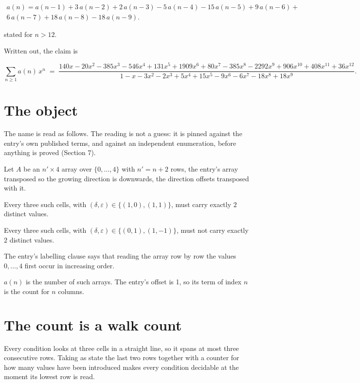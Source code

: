 \documentclass[11pt]{article}
\theoremstyle{definition}
\begin{document}
\begin{multline*} a(n) = a(n-1) + 3\,a(n-2) + 2\,a(n-3) - 5\,a(n-4) - 15\,a(n-5) + 9\,a(n-6) + \\ 6\,a(n-7) + 18\,a(n-8) - 18\,a(n-9). \end{multline*}

stated for $n > 12$.

Written out, the claim is

\[\sum_{n \ge 1} a(n)\,x^n \;=\; \frac{140x - 20x^{2} - 385x^{3} - 546x^{4} + 131x^{5} + 1909x^{6} + 80x^{7} - 385x^{8} - 2292x^{9} + 906x^{10} + 408x^{11} + 36x^{12}}{1 - x - 3x^{2} - 2x^{3} + 5x^{4} + 15x^{5} - 9x^{6} - 6x^{7} - 18x^{8} + 18x^{9}}.\]

\section{The object}

The name is read as follows. The reading is not a guess: it is pinned against the entry's own published terms, and against an independent enumeration, before anything is proved (Section 7).

Let $A$ be an $n' \times 4$ array over $\{0,\dots,4\}$ with $n' = n + 2$ rows, the entry's array transposed so the growing direction is downwards, the direction offsets transposed with it.

Every three such cells, with $(\delta,\varepsilon) \in \{(1,0), (1,1)\}$, must carry exactly $2$ distinct values.

Every three such cells, with $(\delta,\varepsilon) \in \{(0,1), (1,-1)\}$, must not carry exactly $2$ distinct values.

The entry's labelling clause says that reading the array row by row the values $0,\dots,4$ first occur in increasing order.

$a(n)$ is the number of such arrays. The entry's offset is 1, so its term of index $n$ is the count for $n$ columns.

\section{The count is a walk count}

Every condition looks at three cells in a straight line, so it spans at most three consecutive rows. Taking as state the last two rows together with a counter for how many values have been introduced makes every condition decidable at the moment its lowest row is read.
\end{document}
